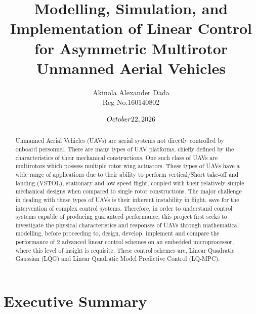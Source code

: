 \documentclass[12pt,a4paper,twoside]{report}
\title{ Modelling, Simulation, and Implementation of Linear Control for Asymmetric Multirotor Unmanned Aerial Vehicles}
\author{Akinola Alexander Dada \\ Reg No.160140802}
\date{$\today$}
\begin{document}
	\begin{abstract}
		Unmanned Aerial Vehicles (UAVs) are aerial systems not directly controlled by onboard personnel. There are many types of UAV platforms, chiefly defined by the characteristics of their mechanical constructions. One such class of UAVs are multirotors which possess multiple rotor wing actuators. These types of UAVs have a wide range of applications due to their ability to perform vertical/Short take-off and landing (VSTOL), stationary and low speed flight, coupled with their relatively simple mechanical designs when compared to single rotor constructions. The major challenge in dealing with these types of UAVs is their inherent instability in flight, save for the intervention of complex control systems. Therefore, in order to understand control systems capable of producing guaranteed performance, this project first seeks to investigate the physical characteristics and responses of UAVs through mathematical modelling, before proceeding to, design, develop, implement and compare the performance of 2 advanced linear control schemes on an embedded microprocessor, where this level of insight is requisite. These control schemes are, Linear Quadratic Gaussian (LQG) and Linear Quadratic Model Predictive Control (LQ-MPC). 
	\end{abstract}
	\newpage
	
	\section*{Executive Summary}
	
\end{document}
